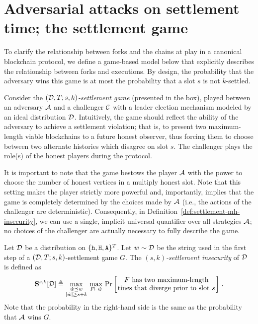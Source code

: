 \section{Adversarial attacks on settlement time; the settlement game}\label{sec:game-mh} 


  To clarify the relationship between forks and the chains at play in a
  canonical blockchain protocol, we define a game-based model below that
  explicitly describes the relationship between forks and executions.
  By design, the probability that the adversary wins this game is at
  most the probability that a slot $s$ is not $k$-settled. 

  Consider the \emph{$(\mathcal{D},T;s,k)$-settlement game} 
  (presented in the box), played
  between an adversary $\mathcal{A}$ and a challenger $\mathcal{C}$ with
  a leader election mechanism modeled by an ideal distribution
  $\mathcal{D}$. Intuitively, the game should reflect the ability of
  the adversary to achieve a settlement violation; that is, to present
  two maximum-length viable blockchains to a future honest observer,
  thus forcing them to choose between two alternate histories which
  disagree on slot $s$.
  The challenger plays the role(s) of the honest players during the
  protocol. 

  It is important to note that the game bestows the player $\mathcal{A}$ 
  with the power to choose the number of honest vertices in 
  a multiply honest slot. 
  Note that this setting makes the player strictly more powerful and, 
  importantly, implies that 
  the game is completely determined 
  by the choices made by $\mathcal{A}$ 
  (i.e., the actions of the challenger are deterministic). 
  Consequently, in Definition~\ref{def:settlement-mh-insecurity}, 
  we can use a single, implicit universal quantifier 
  over all strategies $\mathcal{A}$; no choices of the challenger are actually necessary to fully describe the game.


  \begin{definition}\label{def:settlement-mh-insecurity}
    Let $\mathcal{D}$ be a distribution on $\{\mathtt{h}, \mathtt{H}, \mathtt{A}\}^T$. 
    Let $w \sim \mathcal{D}$ be the string used in the 
    first step of a $(\mathcal{D}, T; s, k)$-settlement game $G$. 
    The \emph{$(s,k)$-settlement insecurity} of $\mathcal{D}$ 
    is defined as 
    \[
      \mathbf{S}^{s,k}[\Distribution] \triangleq 
        \max_{\substack{\hat{w} \PrefixEq w \\ |\hat{w}| \geq s + k}}\,
        \max_{F \Fork \hat{w}}\, 
        \Pr\left[\parbox{50mm}{\centering $F$ has two maximum-length tines that diverge prior to slot $s$}\right]
      \,.
    \]
    Note that the probability in the right-hand side is the same as 
    the probability that $\mathcal{A}$ wins $G$.
  \end{definition}

